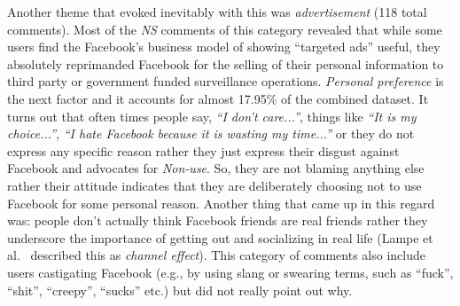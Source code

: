 Another theme that evoked inevitably with this was \textit{advertisement} (118 total comments). Most of the \emph{NS} comments of this category revealed that while some users find the Facebook's business model of showing ``targeted ads'' useful, they absolutely reprimanded Facebook for the selling of their personal information to third party or government funded surveillance operations. \textit{Personal preference} is the next factor and it accounts for almost 17.95\% of the combined dataset. It turns out that often times people say, \textit{``I don't care...''}, things like \textit{``It is my choice...''}, \textit{``I hate Facebook because it is wasting my time...''} or they do not express any specific reason rather they just express their disgust against Facebook and advocates for \emph{Non-use}. So, they are not blaming anything else rather their attitude indicates that they are deliberately choosing not to use Facebook for some personal reason. Another thing that came up in this regard was: people don't actually think Facebook friends are real friends rather they underscore the importance of getting out and socializing in real life (Lampe et al.~\cite{lampe2013users} described this as \textit{channel effect}). This category of comments also include users castigating Facebook (e.g., by using slang or swearing terms, such as ``fuck'', ``shit'', ``creepy'', ``sucks'' etc.) but did not really point out why.  

